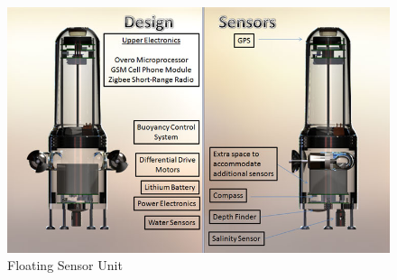 \documentclass[letter,10pt]{article}
\begin{document}
\begin{figure}[h]
 \centering
 \includegraphics[width=\linewidth ]{figures/fsn.jpg}
 \caption{Floating Sensor Unit\label{fig:fsn-drifter}}
\end{figure}
\end{document}
